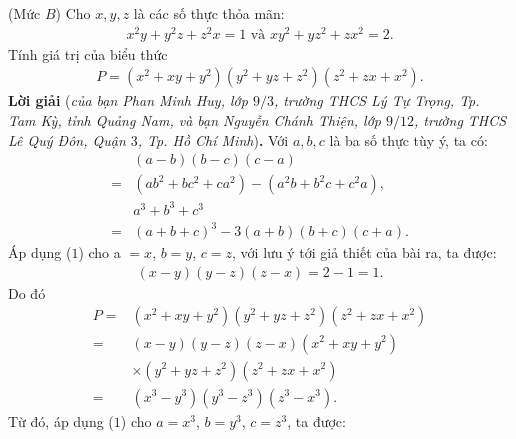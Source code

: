 \begin{multicols}{2}
	{}
	(Mức $B$) Cho $x, y, z$ là các số thực thỏa mãn:
	 \begin{align*}
	 	x^2y+y^2z+z^2x=1 \text{ và } xy^2+yz^2+zx^2=2.
	 \end{align*}
	Tính giá trị của biểu thức
	\begin{align*}
		P=\left(\!x^2\!+\!xy\!+\!y^2\!\right)\!\left(\!y^2\!+\!yz\!+\!z^2\!\right)\!\left(\!z^2\!+\!zx\!+\!x^2\!\right).
	\end{align*}
	\textbf{\color{thachthuctoanhoc}Lời giải} (\textit{của bạn Phan Minh Huy, lớp $9/3$, trường THCS Lý Tự Trọng, Tp. Tam Kỳ, tỉnh Quảng Nam, và bạn Nguyễn Chánh Thiện, lớp $9/12$, trường THCS Lê Quý Đôn, Quận $3$, Tp. Hồ Chí Minh})\textbf{\color{thachthuctoanhoc}.}
	\vskip 0.05cm
	Với $a, b, c$ là ba số thực tùy ý, ta có:
	\begin{align*}
		&\left( {a - b} \right)\left( {b - c} \right)\left( {c - a} \right) \\
		\!\!\!\!= &\left(\! {a{b^2} \!+\! b{c^2} \!+\! c{a^2}} \!\right) \!\!-\!\! \left(\! {{a^2}b \!+\! {b^2}c \!+\! {c^2}a}\! \right)\!\!, \tag{$1$}\\
		&{a^3} + {b^3} + {c^3} \\
		\!\!\!\!= &{\left(\! {a \!+\! b \!+\! c} \!\right)^3} \!-\! 3\left(\! {a \!+\! b}\! \right)\!\left(\! {b \! + \! c}\! \right)\!\left(\! {c \!+\! a} \!\right). \tag{$2$}
	\end{align*}
	Áp dụng ($1$) cho a $= x$, $b = y$, $c = z$, với lưu ý tới giả thiết của bài ra, ta được:
	\begin{align*}
		\left( {x - y} \right)\left( {y - z} \right)\left( {z - x} \right) = 2 - 1 = 1.
	\end{align*}
	Do đó
	\begin{align*}
			P = &\left( {{x^2} \!+\! xy \!+\! {y^2}} \right)\left( {{y^2} \!+\! yz \!+\! {z^2}} \right)\left( {{z^2} \!+\! zx \!+\! {x^2}} \right)\\
			 =& \left( {x - y} \right)\left( {y - z} \right)\left( {z - x} \right)\left( {{x^2} + xy + {y^2}} \right)\\
			 &\times\left( {{y^2} + yz + {z^2}} \right)\left( {{z^2} + zx + {x^2}} \right)\\
			 = &\left( {{x^3} - {y^3}} \right)\left( {{y^3} - {z^3}} \right)\left( {{z^3} - {x^3}} \right).
	\end{align*}
	Từ đó, áp dụng ($1$) cho  $a= x^3$, $b = y^3$, \linebreak $c = z^3$, ta được:
	\begin{align*}

\end{align*}
\end{multicols}
